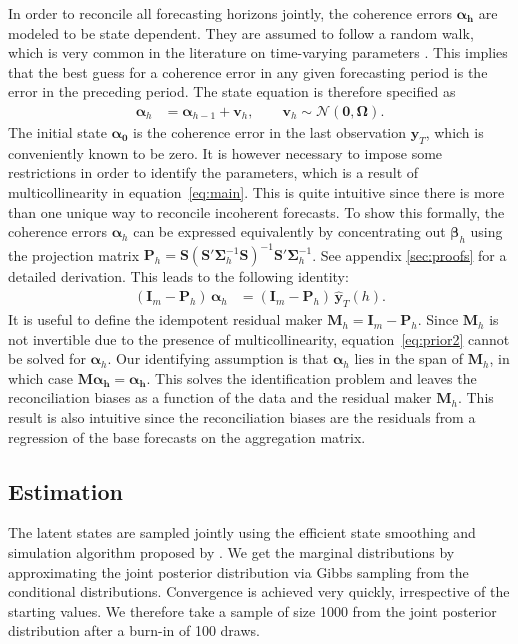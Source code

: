 \documentclass[a4paper,fleqn,11pt]{article}
\begin{document}
In order to reconcile all forecasting horizons jointly, the coherence errors $\boldsymbol{\alpha_h}$ are modeled to be state dependent. They are assumed to follow a random walk, which is very common in the literature on time-varying parameters \citep[see for instance][and references therein]{Primiceri2005}. This implies that the best guess for a coherence error in any given forecasting period is the error in the preceding period. The state equation is therefore specified as
\begin{align}
	\label{eq:state}
	\boldsymbol{\alpha}_h & = \boldsymbol{\alpha}_{h-1} + \textbf{v}_h, \qquad \textbf{v}_h \sim \mathcal{N}(\textbf{0}, \boldsymbol{\Omega}).
\end{align}
The initial state $\boldsymbol{\alpha_0}$ is the coherence error in the last observation $\textbf{y}_{T}$, which is conveniently known to be zero. It is however necessary to impose some restrictions in order to identify the parameters, which is a result of multicollinearity in equation~\eqref{eq:main}. This is quite intuitive since there is more than one unique way to reconcile incoherent forecasts. To show this formally, the coherence errors $\boldsymbol{\alpha}_h$ can be expressed equivalently by concentrating out $\boldsymbol{\beta}_h$ using the projection matrix $\textbf{P}_h = \textbf{S}(\textbf{S}'\boldsymbol{\Sigma}_h^{-1} \textbf{S})^{-1}\textbf{S}'\boldsymbol{\Sigma}_h^{-1}$. See appendix \ref{sec:proofs} for a detailed derivation. This leads to the following identity:
\begin{align}
	\label{eq:prior2}
	(\textbf{I}_m - \textbf{P}_h)\, \boldsymbol{\alpha}_h &= (\textbf{I}_m - \textbf{P}_h)\, \mathbf{\hat{y}}_T(h).
\end{align}
It is useful to define the idempotent residual maker $\textbf{M}_h = \textbf{I}_m - \textbf{P}_h$. Since $\textbf{M}_h$ is not invertible due to the presence of multicollinearity, equation~\eqref{eq:prior2} cannot be solved for $\boldsymbol{\alpha}_h$. Our identifying assumption is that $\boldsymbol{\alpha}_h$ lies in the span of $\textbf{M}_h$, in which case $\textbf{M}\boldsymbol{\alpha_h} = \boldsymbol{\alpha_h}$. This solves the identification problem and leaves the reconciliation biases as a function of the data and the residual maker $\textbf{M}_h$. This result is also intuitive since the reconciliation biases are the residuals from a regression of the base forecasts on the aggregation matrix.


\subsection{Estimation}\label{sec:estim}
The latent states are sampled jointly using the efficient state smoothing and simulation algorithm proposed by \cite{Chan2009}. We get the marginal distributions by approximating the joint posterior distribution via Gibbs sampling from the conditional distributions. Convergence is achieved very quickly, irrespective of the starting values. We therefore take a sample of size 1000 from the joint posterior distribution after a burn-in of 100 draws.
\end{document}
